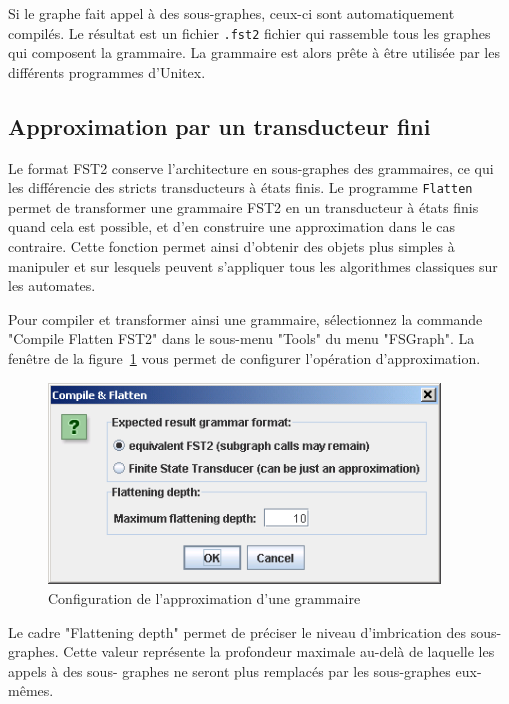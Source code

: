 \noindent Si le graphe fait appel à des sous-graphes, ceux-ci sont automatiquement compilés. Le
résultat est un fichier \verb+.fst2+ fichier qui rassemble tous les
graphes qui composent la grammaire. La grammaire est alors prête à être utilisée par les
différents programmes d’Unitex.


\subsection{Approximation par un transducteur fini}
\label{flatten-section}
Le format FST2 conserve l’architecture en sous-graphes des grammaires, ce qui les différencie
des stricts transducteurs à états finis. Le programme \verb+Flatten+ permet de transformer
une grammaire FST2 en un transducteur à états finis quand cela est possible, et d’en
construire une approximation dans le cas contraire. Cette fonction permet ainsi d’obtenir des objets
plus simples à manipuler et sur lesquels peuvent s’appliquer tous les algorithmes classiques sur
les automates.


\bigskip
\noindent Pour compiler et transformer ainsi une grammaire, sélectionnez la commande "Compile
Flatten FST2" dans le sous-menu "Tools" du menu "FSGraph". La fenêtre de la figure~\ref{fig-flatten-configuration}
vous permet de configurer l’opération d’approximation.

\bigskip
\begin{figure}[!h]
\begin{center}
\includegraphics[width=10.4cm]{resources/img/fig6-5.png}
\caption{Configuration de l’approximation d’une grammaire\label{fig-flatten-configuration}}
\end{center}
\end{figure}

\noindent Le cadre "Flattening depth" permet de préciser le niveau d’imbrication des sous-graphes.
Cette valeur représente la profondeur maximale au-delà de laquelle les appels à des sous-
graphes ne seront plus remplacés par les sous-graphes eux-mêmes.


